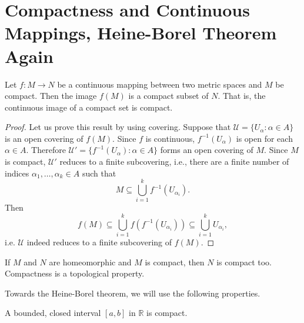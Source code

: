 \section{Compactness and Continuous Mappings, Heine-Borel Theorem Again}
\label{sec:heine-borel}

\begin{thm}
  Let $f : M \to N$ be a continuous mapping between two metric spaces and $M$ be compact.
  Then the image $f(M)$ is a compact subset of $N$.
  That is, the continuous image of a compact set is compact.
\end{thm}

\begin{proof}
  Let us prove this result by using covering.
  Suppose that $\mathcal{U} = \{ U_\alpha \colon \alpha \in A \}$ is an open covering of $f(M)$.
  Since $f$ is continuous, $f^{-1}(U_\alpha)$ is open for each $\alpha \in A$.
  Therefore $\mathcal{U}' = \{ f^{-1}(U_\alpha) \colon \alpha \in A \}$ forms an open covering of $M$.
  Since $M$ is compact, $\mathcal{U}'$ reduces to a finite subcovering, i.e., there are a finite number of indices $\alpha_1, \dots, \alpha_k \in A$ such that
  \[
    M \subseteq \bigcup_{i=1}^k f^{-1}(U_{\alpha_i}).
  \]
  Then
  \[
    f(M) \subseteq \bigcup_{i=1}^k f(f^{-1}(U_{\alpha_i})) \subseteq \bigcup_{i=1}^k U_{\alpha_i},
  \]
  i.e. $\mathcal{U}$ indeed reduces to a finite subcovering of $f(M)$.
\end{proof}

\begin{cor}
  If $M$ and $N$ are homeomorphic and $M$ is compact, then $N$ is compact too.
  Compactness is a topological property.
\end{cor}

Towards the Heine-Borel theorem, we will use the following properties.

\begin{thm}
  A bounded, closed interval $[a,b]$ in $\mathbb{R}$ is compact.
\end{thm}

